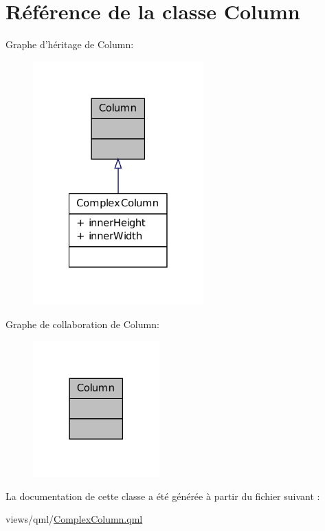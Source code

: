 \hypertarget{classColumn}{\section{Référence de la classe Column}
\label{classColumn}
}


Graphe d'héritage de Column\-:
\nopagebreak
\begin{figure}[H]
\begin{center}
\leavevmode
\includegraphics[width=186pt]{classColumn__inherit__graph}
\end{center}
\end{figure}


Graphe de collaboration de Column\-:
\nopagebreak
\begin{figure}[H]
\begin{center}
\leavevmode
\includegraphics[width=138pt]{classColumn__coll__graph}
\end{center}
\end{figure}


La documentation de cette classe a été générée à partir du fichier suivant \-:\begin{DoxyCompactItemize}
\item 
views/qml/\hyperlink{ComplexColumn_8qml}{Complex\-Column.\-qml}\end{DoxyCompactItemize}
